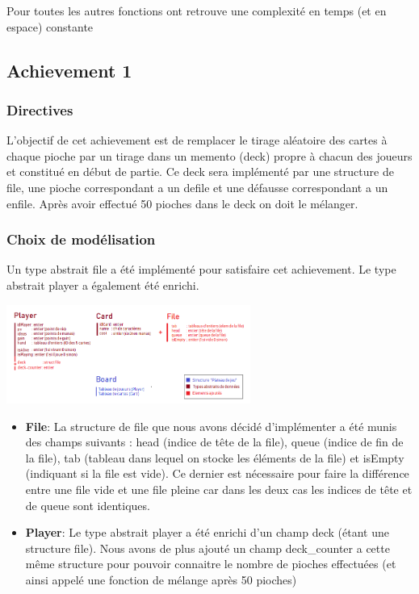 \documentclass[a4paper]{article}
\begin{document}
Pour toutes les autres fonctions ont retrouve une complexité en temps (et en espace) constante
\newpage
\subsection{Achievement 1}
\subsubsection{Directives}

L'objectif de cet achievement est de remplacer le tirage aléatoire des cartes à chaque pioche par un tirage dans un memento (deck) propre à chacun des joueurs et constitué en début de partie. Ce deck sera implémenté par une structure de file, une pioche correspondant a un defile et une défausse correspondant a un enfile. Après avoir effectué 50 pioches dans le deck on doit le mélanger. 

\subsubsection{Choix de modélisation}

Un type abstrait file a été implémenté pour satisfaire cet achievement. Le type abstrait player a également été enrichi.\\ 
\begin{center}
\includegraphics[width=0.6\textwidth]{Ach1}\\[1cm]
\end{center}

\begin{itemize}

\item \textbf{File}: 
La structure de file que nous avons décidé d'implémenter a été munis des champs suivants : head (indice de tête de la file), queue (indice de fin de la file), tab (tableau dans lequel on stocke les éléments de la file) et isEmpty (indiquant si la file est vide). Ce dernier est nécessaire pour faire la différence entre une file vide et une file pleine car dans les deux cas les indices de tête et de queue sont identiques.\\

\item \textbf{Player}: 
Le type abstrait player a été enrichi d'un champ deck (étant une structure file). Nous avons de plus ajouté un champ deck\_counter a cette même structure pour pouvoir connaitre le nombre de pioches effectuées (et ainsi appelé une fonction de mélange après 50 pioches)\\
\end{itemize}
\end{document}
